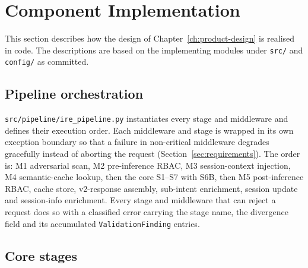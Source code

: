 \section{Component Implementation}\label{sec:component-implementation}

This section describes how the design of Chapter~\ref{ch:product-design} is
realised in code. The descriptions are based on the implementing modules under
\texttt{src/} and \texttt{config/} as committed.

\subsection*{Pipeline orchestration}

\texttt{src/pipeline/ire\_pipeline.py} instantiates every stage and middleware
and defines their execution order. Each middleware and stage is wrapped in its
own exception boundary so that a failure in non-critical middleware degrades
gracefully instead of aborting the request (Section~\ref{sec:requirements}).
The order is: M1 adversarial scan, M2 pre-inference RBAC, M3 session-context
injection, M4 semantic-cache lookup, then the core S1--S7 with S6B, then M5
post-inference RBAC, cache store, v2-response assembly, sub-intent enrichment,
session update and session-info enrichment. Every stage and middleware that
can reject a request does so with a classified error carrying the stage name,
the divergence field and its accumulated \texttt{ValidationFinding} entries.

\subsection*{Core stages}

